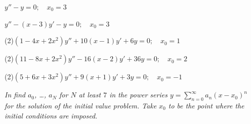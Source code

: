 \begin{exerciselistTwoColumn}
\item\label{exer:7.2.16}$y''-y=0;\quad   x_0=3$
\item\label{exer:7.2.17}$y''-(x-3)y'-y=0;\quad   x_0=3$
\item(2)\label{exer:7.2.18}$(1-4x+2x^2)y''+10(x-1)y'+6y=0;\quad  x_0=1$
\item(2)\label{exer:7.2.19}$(11-8x+2x^2)y''-16(x-2)y'+36y=0;\quad  x_0=2$
\item(2)\label{exer:7.2.20}$(5+6x+3x^2)y''+9(x+1)y'+3y=0;\quad  x_0=-1$
\end{exerciselistTwoColumn}
%
\textsl{In 
 find $a_0$, \dots, $a_N$ for $N$ at least $7$ in the power series
$y=\sum_{n=0}^\infty a_n(x-x_0)^n$
 for the  solution of the initial value problem.  Take $x_0$ to be the
point where the initial conditions are imposed.}
